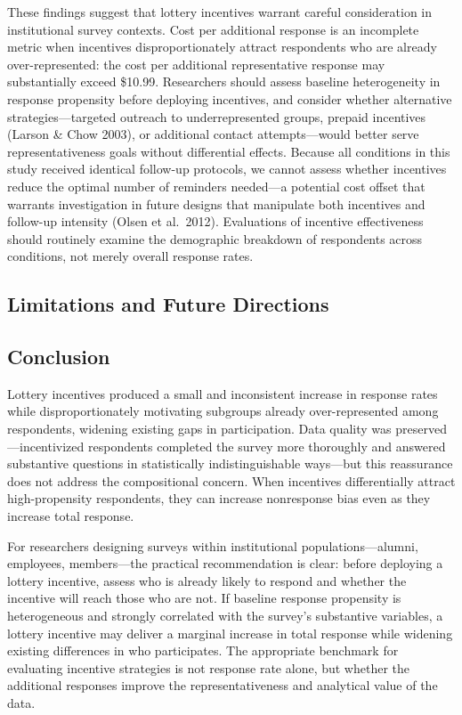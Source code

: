 \documentclass[12pt]{article}
\begin{document}
These findings suggest that lottery incentives warrant careful consideration in institutional survey contexts. Cost per additional response is an incomplete metric when incentives disproportionately attract respondents who are already over-represented: the cost per additional representative response may substantially exceed \$10.99. Researchers should assess baseline heterogeneity in response propensity before deploying incentives, and consider whether alternative strategies---targeted outreach to underrepresented groups, prepaid incentives (Larson \& Chow 2003), or additional contact attempts---would better serve representativeness goals without differential effects. Because all conditions in this study received identical follow-up protocols, we cannot assess whether incentives reduce the optimal number of reminders needed---a potential cost offset that warrants investigation in future designs that manipulate both incentives and follow-up intensity (Olsen et al.\ 2012). Evaluations of incentive effectiveness should routinely examine the demographic breakdown of respondents across conditions, not merely overall response rates.

\subsection{Limitations and Future Directions}


\subsection{Conclusion}

Lottery incentives produced a small and inconsistent increase in response rates while disproportionately motivating subgroups already over-represented among respondents, widening existing gaps in participation. Data quality was preserved---incentivized respondents completed the survey more thoroughly and answered substantive questions in statistically indistinguishable ways---but this reassurance does not address the compositional concern. When incentives differentially attract high-propensity respondents, they can increase nonresponse bias even as they increase total response.

For researchers designing surveys within institutional populations---alumni, employees, members---the practical recommendation is clear: before deploying a lottery incentive, assess who is already likely to respond and whether the incentive will reach those who are not. If baseline response propensity is heterogeneous and strongly correlated with the survey's substantive variables, a lottery incentive may deliver a marginal increase in total response while widening existing differences in who participates. The appropriate benchmark for evaluating incentive strategies is not response rate alone, but whether the additional responses improve the representativeness and analytical value of the data.
\end{document}
